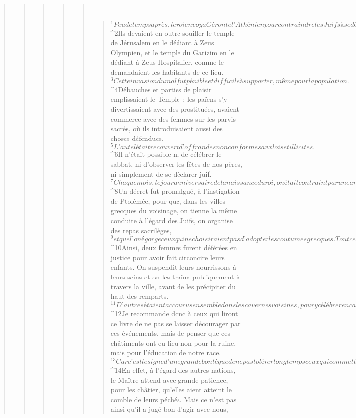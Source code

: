 \begin{verse}
\begin{verse}
\begin{verse}
\begin{verse}
\begin{verse}
         
      \bchapter{}
      \begin{verse}
${}^{1}Peu de temps après, le roi envoya Géronte l’Athénien pour contraindre les Juifs à se détourner des lois de leurs pères et à ne plus se gouverner selon les lois de Dieu. 
${}^{2}Ils devaient en outre souiller le temple de Jérusalem en le dédiant à Zeus Olympien, et le temple du Garizim en le dédiant à Zeus Hospitalier, comme le demandaient les habitants de ce lieu. 
${}^{3}Cette invasion du mal fut pénible et difficile à supporter, même pour la population. 
${}^{4}Débauches et parties de plaisir emplissaient le Temple : les païens s’y divertissaient avec des prostituées, avaient commerce avec des femmes sur les parvis sacrés, où ils introduisaient aussi des choses défendues. 
${}^{5}L’autel était recouvert d’offrandes non conformes aux lois et illicites. 
${}^{6}Il n’était possible ni de célébrer le sabbat, ni d’observer les fêtes de nos pères, ni simplement de se déclarer juif. 
${}^{7}Chaque mois, le jour anniversaire de la naissance du roi, on était contraint par une amère nécessité de prendre part à un repas sacrilège. Et lors des fêtes dionysiaques, on était forcé de suivre, couronné de lierre, le cortège en l’honneur de Dionysos. 
${}^{8}Un décret fut promulgué, à l’instigation de Ptolémée, pour que, dans les villes grecques du voisinage, on tienne la même conduite à l’égard des Juifs, on organise des repas sacrilèges, 
${}^{9}et que l’on égorge ceux qui ne choisiraient pas d’adopter les coutumes grecques. Tout ceci laissait entrevoir l’imminence de la détresse. 
${}^{10}Ainsi, deux femmes furent déférées en justice pour avoir fait circoncire leurs enfants. On suspendit leurs nourrissons à leurs seins et on les traîna publiquement à travers la ville, avant de les précipiter du haut des remparts. 
${}^{11}D’autres étaient accourus ensemble dans les cavernes voisines, pour y célébrer en cachette le septième jour. On les dénonça à Philippe, et ils furent tous brûlés, car ils s’étaient gardés de se défendre eux-mêmes, par respect pour la sainteté du jour.
${}^{12}Je recommande donc à ceux qui liront ce livre de ne pas se laisser décourager par ces événements, mais de penser que ces châtiments ont eu lieu non pour la ruine, mais pour l’éducation de notre race. 
${}^{13}Car c’est le signe d’une grande bonté que de ne pas tolérer longtemps ceux qui commettent l’impiété, mais de leur infliger sans retard des châtiments. 
${}^{14}En effet, à l’égard des autres nations, le Maître attend avec grande patience, pour les châtier, qu’elles aient atteint le comble de leurs péchés. Mais ce n’est pas ainsi qu’il a jugé bon d’agir avec nous, 

\end{verse}
\end{verse}
\end{verse}
\end{verse}
\end{verse}
\end{verse}
